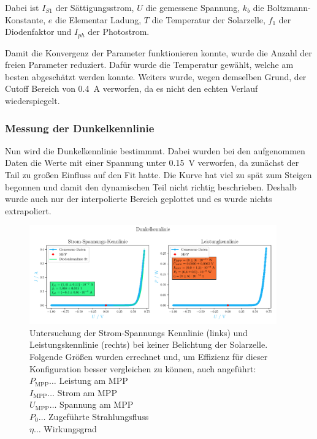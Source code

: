 \documentclass[12pt,english,ngerman]{scrartcl}
\begin{document}
Dabei ist $I_{S1}$ der Sättigungsstrom, $U$ die gemessene Spannung, $k_b$ die
Boltzmann-Konstante, $e$ die Elementar Ladung, $T$ die Temperatur der
Solarzelle, $f_1$ der Diodenfaktor und $I_{ph}$ der Photostrom.

Damit die Konvergenz der Parameter funktionieren konnte, wurde die Anzahl der
freien Parameter reduziert. Dafür wurde die Temperatur gewählt, welche am
besten abgeschätzt werden konnte. Weiters wurde, wegen demselben Grund, der
Cutoff Bereich von \SI{0.4}{\ampere} verworfen, da es nicht den echten Verlauf
wiederspiegelt.

\subsubsection{Messung der Dunkelkennlinie}

Nun wird die Dunkelkennlinie bestimmmt. Dabei wurden bei den aufgenommen Daten
die Werte mit einer Spannung unter \SI{0.15}{\volt} verworfen, da zunächst der
Tail zu großen Einfluss auf den Fit hatte. Die Kurve hat viel zu spät zum
Steigen begonnen und damit den dynamischen Teil nicht richtig beschrieben.
Deshalb wurde auch nur der interpolierte Bereich geplottet und es wurde nichts
extrapoliert.

\begin{figure}[H]
	\centering
	\includegraphics[width=0.95\textwidth]{figures/dunkelkennlinie.pdf}
	\caption[Dunkelkennlinie einer Solarzelle]{Untersuchung der Strom-Spannungs Kennlinie
		(links) und Leistungskennlinie (rechts) bei keiner Belichtung der Solarzelle.
		Folgende Größen wurden errechnet und, um Effizienz für dieser Konfiguration
		besser vergleichen zu können, auch angeführt: \\
		$P_\text{MPP} \dots$ Leistung am MPP          \\
		$I_\text{MPP} \dots$ Strom am MPP             \\
		$U_\text{MPP} \dots$ Spannung am MPP          \\
		$P_0 \dots$ Zugeführte Strahlungsfluss        \\
		$\eta \dots$ Wirkungsgrad
	}\label{fig:ausw_kennlinie_dunkel}
\end{figure}
\end{document}
